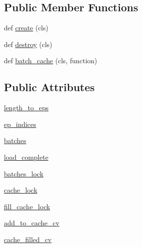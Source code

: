 \subsection*{Public Member Functions}
\begin{DoxyCompactItemize}
\item 
def \hyperlink{classparlai_1_1core_1_1pytorch__data__teacher_1_1BatchSortCache_a272dbfe6529aa39066b4ad8504f40f5d}{create} (cls)
\item 
def \hyperlink{classparlai_1_1core_1_1pytorch__data__teacher_1_1BatchSortCache_a115f5df4f4fafa087f592e9a0ab48d9c}{destroy} (cls)
\item 
def \hyperlink{classparlai_1_1core_1_1pytorch__data__teacher_1_1BatchSortCache_ae97120b4fec464f79c7d0d9cd54c101d}{batch\+\_\+cache} (cls, function)
\end{DoxyCompactItemize}
\subsection*{Public Attributes}
\begin{DoxyCompactItemize}
\item 
\hyperlink{classparlai_1_1core_1_1pytorch__data__teacher_1_1BatchSortCache_a68076c873c29c3752c391937c2fe6adc}{length\+\_\+to\+\_\+eps}
\item 
\hyperlink{classparlai_1_1core_1_1pytorch__data__teacher_1_1BatchSortCache_a85c90f8ae87edc9a122c8cdea6854857}{ep\+\_\+indices}
\item 
\hyperlink{classparlai_1_1core_1_1pytorch__data__teacher_1_1BatchSortCache_a892022928bc71b59225d16eefbbfdf60}{batches}
\item 
\hyperlink{classparlai_1_1core_1_1pytorch__data__teacher_1_1BatchSortCache_a50725d8fc600b792cd856d1ff4bdaca3}{load\+\_\+complete}
\item 
\hyperlink{classparlai_1_1core_1_1pytorch__data__teacher_1_1BatchSortCache_a535808bc8ccedb06dd0a09d9306ed84c}{batches\+\_\+lock}
\item 
\hyperlink{classparlai_1_1core_1_1pytorch__data__teacher_1_1BatchSortCache_a3b85c080ff697ef4454ca452837b5107}{cache\+\_\+lock}
\item 
\hyperlink{classparlai_1_1core_1_1pytorch__data__teacher_1_1BatchSortCache_a668f1a87f3c5c4776bf06c884ef344d5}{fill\+\_\+cache\+\_\+lock}
\item 
\hyperlink{classparlai_1_1core_1_1pytorch__data__teacher_1_1BatchSortCache_aee6ea11fd9febb0d4178127cffd63561}{add\+\_\+to\+\_\+cache\+\_\+cv}
\item 
\hyperlink{classparlai_1_1core_1_1pytorch__data__teacher_1_1BatchSortCache_ad35a73a670bf0aab8f9b9bf7caffe207}{cache\+\_\+filled\+\_\+cv}
\end{DoxyCompactItemize}


